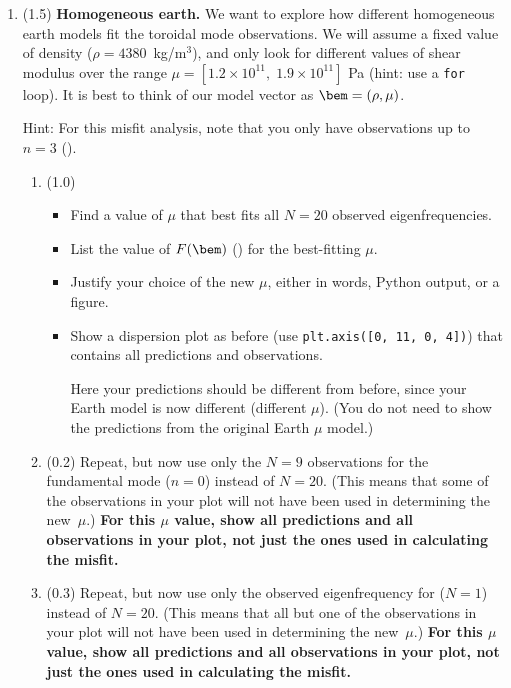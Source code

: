 \documentclass[11pt,titlepage,fleqn]{article}
\begin{document}
\begin{enumerate}
\item (1.5) {\bf Homogeneous earth.} We want to explore how different homogeneous earth models fit the toroidal mode observations. We will assume a fixed value of density ($\rho = 4380$~kg/m$^3$), and only look for different values of shear modulus over the range $\mu = [1.2\times 10^{11},\; 1.9 \times 10^{11}]$ Pa (hint: use a {\tt for} loop). It is best to think of our model vector as $\bem = (\rho, \mu)$.

Hint: For this misfit analysis, note that you only have observations up to $n = 3$ ().

\begin{enumerate}
\item (1.0)
\begin{itemize}
\item Find a value of $\mu$ that best fits all $N=20$ observed eigenfrequencies.
\item List the value of $F(\bem)$ () for the best-fitting $\mu$.
\item Justify your choice of the new $\mu$, either in words, Python output, or a figure.
\item Show a dispersion plot as before (use \verb+plt.axis([0, 11, 0, 4])+) that contains all predictions and observations.

Here your predictions should be different from before, since your Earth model is now different (\ie different $\mu$). (You do not need to show the predictions from the original Earth $\mu$ model.)
\end{itemize}

\item (0.2) Repeat, but now use only the $N = 9$ observations for the fundamental mode ($n=0$) instead of $N=20$. (This means that some of the observations in your plot will not have been used in determining the new~$\mu$.)
{\bf For this $\mu$ value, show all predictions and all observations in your plot, not just the ones used in calculating the misfit.}

\item (0.3) Repeat, but now use only the observed eigenfrequency for  ($N=1$) instead of $N=20$. (This means that all but one of the observations in your plot will not have been used in determining the new~$\mu$.)
{\bf For this $\mu$ value, show all predictions and all observations in your plot, not just the ones used in calculating the misfit.}


\end{enumerate}
\end{enumerate}
\end{document}
